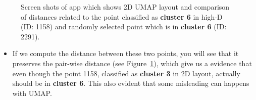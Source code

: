 \documentclass[
  12pt]{article}
\providecommand{\tightlist}{%
  \setlength{\itemsep}{0pt}\setlength{\parskip}{0pt}}\usepackage{longtable,booktabs,array}
\begin{document}
\begin{figure}[H]

\begin{minipage}[t]{\linewidth}

{\centering 


}

\subcaption{\label{fig-pbmc2_sc7}}
\end{minipage}%

\caption{\label{fig-pbmc2_appsc}Screen shots of app which shows 2D UMAP
layout and comparison of distances related to the point classified as
\textbf{cluster 6} in high-D (ID: 1158) and randomly selected point
which is in \textbf{cluster 6} (ID: 2291).}

\end{figure}

\begin{itemize}
\tightlist
\item
  If we compute the distance between these two points, you will see that
  it preserves the pair-wise distance (see
  Figure~\ref{fig-pbmc2_appsc}), which give us a evidence that even
  though the point 1158, classified as \textbf{cluster 3} in 2D layout,
  actually should be in \textbf{cluster 6}. This also evident that some
  misleading can happens with UMAP.
\end{itemize}
\end{document}
